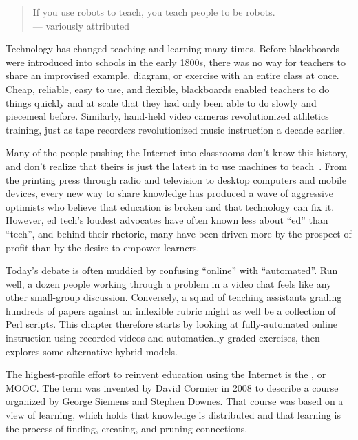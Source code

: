 
\begin{quote}

  If you use robots to teach, you teach people to be robots. \\
  --- variously attributed

\end{quote}

Technology has changed teaching and learning many times.
Before blackboards were introduced into schools in the early 1800s,
there was no way for teachers to share an improvised example,
diagram,
or exercise with an entire class at once.
Cheap,
reliable,
easy to use,
and flexible,
blackboards enabled teachers to do things quickly and at scale
that they had only been able to do slowly and piecemeal before.
Similarly,
hand-held video cameras revolutionized athletics training,
just as tape recorders revolutionized music instruction a decade earlier.

Many of the people pushing the Internet into classrooms don't know this history,
and don't realize that theirs is just the latest in
to use machines to teach~\cite{Watt2014}.
From the printing press through radio and television
to desktop computers and mobile devices,
every new way to share knowledge has produced a wave of aggressive optimists
who believe that education is broken and that technology can fix it.
However,
ed tech's loudest advocates have often known less about ``ed'' than ``tech'',
and behind their rhetoric,
many have been driven more by the prospect of profit
than by the desire to empower learners.

Today's debate is often muddied by confusing ``online'' with ``automated''.
Run well,
a dozen people working through a problem in a video chat
feels like any other small-group discussion.
Conversely,
a squad of teaching assistants grading hundreds of papers against an inflexible rubric
might as well be a collection of Perl scripts.
This chapter therefore starts by looking at fully-automated online instruction
using recorded videos and automatically-graded exercises,
then explores some alternative hybrid models.


The highest-profile effort to reinvent education using the Internet
is the , or MOOC.
The term was invented by David Cormier in 2008
to describe a course organized by George Siemens and Stephen Downes.
That course was based on a  view of learning,
which holds that knowledge is distributed
and that learning is the process of finding, creating, and pruning connections.


